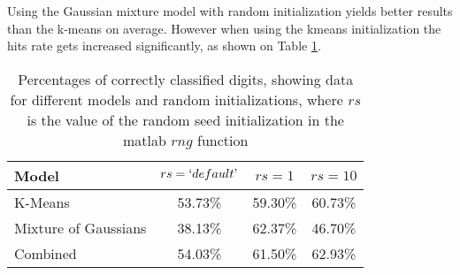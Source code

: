\documentclass[12pt]{article}
\begin{document}
Using the Gaussian mixture model with random initialization yields better results than the k-means on average. 
However when using the kmeans initialization the hits rate gets increased significantly, as shown on 
Table \ref{tab:results}.

\begin{table}[h]
\caption[Table caption text]{Percentages of correctly classified digits, showing data for different models and random initializations, where $rs$ is the value of the random seed initialization in the matlab $rng$ function }
\label{tab:results}
\begin{tabular}{|l|c|c|c|}
\hline
Model                 & $rs = ` default \textrm'$ & $rs = 1$ & $rs = 10$ \\ \hline
K-Means               & 53.73\%             &   	59.30\%    &    60.73\%     \\ \hline
Mixture of  Gaussians & 38.13\%             &   	62.37\%    &    46.70\%     \\ \hline
Combined              & 54.03\%             &    61.50\%    &    62.93\%     \\ \hline
\end{tabular}
\end{table}
 
\end{document}
